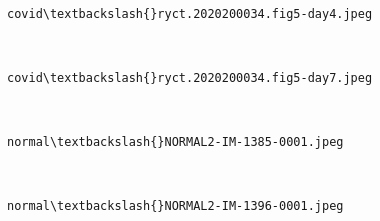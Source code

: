 \documentclass[11pt]{article}
\begin{document}
    \begin{center}
    \end{center}
    { \hspace*{\fill} \\}
    
    \begin{Verbatim}[commandchars=\\\{\}]
covid\textbackslash{}ryct.2020200034.fig5-day4.jpeg
    \end{Verbatim}

    \begin{center}
    \end{center}
    { \hspace*{\fill} \\}
    
    \begin{Verbatim}[commandchars=\\\{\}]
covid\textbackslash{}ryct.2020200034.fig5-day7.jpeg
    \end{Verbatim}

    \begin{center}
    \end{center}
    { \hspace*{\fill} \\}
    
    \begin{Verbatim}[commandchars=\\\{\}]
normal\textbackslash{}NORMAL2-IM-1385-0001.jpeg
    \end{Verbatim}

    \begin{center}
    \end{center}
    { \hspace*{\fill} \\}
    
    \begin{Verbatim}[commandchars=\\\{\}]
normal\textbackslash{}NORMAL2-IM-1396-0001.jpeg
    \end{Verbatim}

    \begin{center}
    \end{center}
    { \hspace*{\fill} \\}
    
\end{document}

